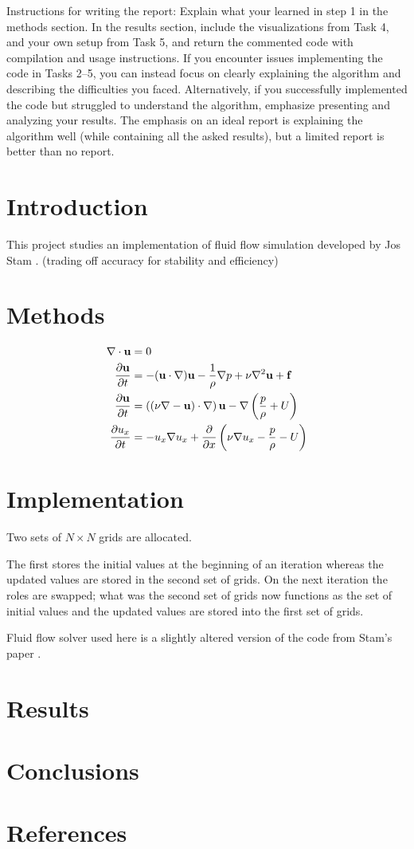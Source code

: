 \documentclass[12pt, letterpaper]{article}
\author{Tom Rindell}
\title{}
\begin{document}
Instructions for writing the report: Explain what your learned in step 1 in the methods section. In the results
section, include the visualizations from Task 4, and your own setup from Task 5, and return the commented code
with compilation and usage instructions. If you encounter issues implementing the code in Tasks 2–5, you can
instead focus on clearly explaining the algorithm and describing the difficulties you faced. Alternatively, if you
successfully implemented the code but struggled to understand the algorithm, emphasize presenting and analyzing
your results. The emphasis on an ideal report is explaining the algorithm well (while containing all the asked
results), but a limited report is better than no report.

\section{Introduction}
This project studies an implementation of fluid flow simulation developed by Jos Stam \citep{}.
(trading off accuracy for stability and efficiency)

\section{Methods}
\begin{align*}
  \nabla\cdot\vb{u} &= 0 \\
  \frac{\partial\vb{u}}{\partial t} &= -(\vb{u}\cdot \nabla)\vb{u}-\frac{1}{\rho}\nabla p + \nu \nabla^{2}\vb{u} + \vb{f}
  \\\frac{\partial\vb{u}}{\partial t} &= \left( (\nu \nabla-\vb{u} )\cdot \nabla\right) \vb{u}-  \nabla \left(\frac{p}{\rho} + U\right)
  \\\frac{\partial{u_{x}}}{\partial t} &= -{u}_{x} \nabla{u_{x}}+  \frac{\partial}{\partial x} \left(\nu\nabla{u_{x}}-  \frac{p}{\rho} - U\right)
\end{align*}

\section{Implementation}
Two sets of $N\times N$ grids are allocated.

The first stores the initial values at the beginning of an iteration whereas the updated values are stored in the second set of grids.
On the next iteration the roles are swapped; what was the second set of grids now functions as the set of initial values and the updated values are stored into the first set of grids.

Fluid flow solver used here is a slightly altered version of the code from Stam's paper \citep{}.


\section{Results}

\section{Conclusions}

\section{References}
\end{document}
